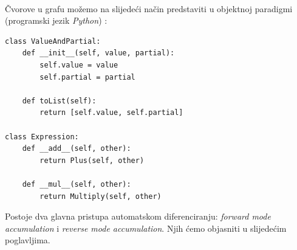 \documentclass[zavrsnirad]{fer}
\begin{document}
\\
Čvorove u grafu možemo na slijedeći način predstaviti u objektnoj paradigmi (programski jezik \textit{Python}) \cite{wiki:autodiff}:
\lstset{language=python}
\begin{lstlisting}
class ValueAndPartial:
    def __init__(self, value, partial):
        self.value = value
        self.partial = partial

    def toList(self):
        return [self.value, self.partial]

class Expression:
    def __add__(self, other):
        return Plus(self, other)

    def __mul__(self, other):
        return Multiply(self, other)
\end{lstlisting}
Postoje dva glavna pristupa automatskom diferenciranju: \textit{forward mode accumulation} i \textit{reverse mode accumulation}. Njih ćemo objasniti u slijedećim poglavljima.
\end{document}
